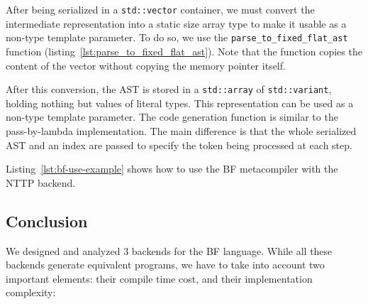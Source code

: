 \documentclass[../../main.tex]{subfiles}
\begin{document}
\clearpage%





After being serialized in a \lstinline|std::vector| container, we must convert
the intermediate representation into a static size array type to make it usable
as a non-type template parameter. To do so, we use the
\lstinline|parse_to_fixed_flat_ast| function
(listing~\ref{lst:parse_to_fixed_flat_ast}). Note that the function copies the content of
the vector without copying the memory pointer itself.



After this conversion, the AST is stored in a \lstinline|std::array| of
\lstinline|std::variant|, holding nothing but values of literal types. This
representation can be used as a non-type template parameter. The code
generation function is similar to the pass-by-lambda implementation. The main
difference is that the whole serialized AST and an index are passed to specify
the token being processed at each step.

Listing~\ref{lst:bf-use-example} shows how to use the BF metacompiler with the
NTTP backend.

\subsection{Conclusion}

We designed and analyzed 3 backends for the BF language. While all these
backends generate equivalent programs, we have to take into account two
important elements: their compile time cost, and their implementation
complexity:
\end{document}
